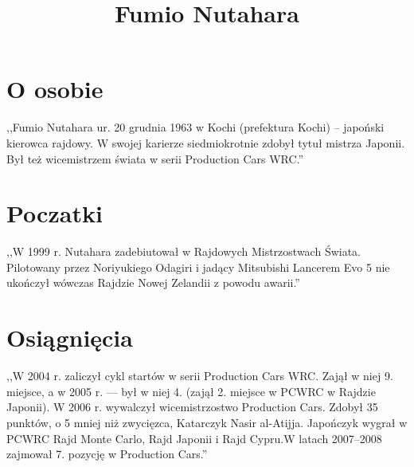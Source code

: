 \documentclass[a4paper,12pt]{article}
\title{Fumio Nutahara}
\author{}
\begin{document}
\maketitle
\section{O osobie}
\label {o_nim}
,,Fumio Nutahara ur. 20 grudnia 1963 w Kochi (prefektura Kochi) – japoński kierowca rajdowy. W swojej karierze siedmiokrotnie zdobył tytuł mistrza Japonii. Był też wicemistrzem świata w serii Production Cars WRC.''
\section{Poczatki}
\label{pocz}
,,W 1999 r. Nutahara zadebiutował w Rajdowych Mistrzostwach Świata. Pilotowany przez Noriyukiego Odagiri i jadący Mitsubishi Lancerem Evo 5 nie ukończył wówczas Rajdzie Nowej Zelandii z powodu awarii.''
\section{Osiągnięcia}
\label{osi}
,,W 2004 r. zaliczył cykl startów w serii Production Cars WRC. Zajął w niej 9. miejsce, a w 2005 r. --- był w niej 4. (zajął 2. miejsce w PCWRC w Rajdzie Japonii). W 2006 r. wywalczył wicemistrzostwo Production Cars. Zdobył 35 punktów, o 5 mniej niż zwycięzca, Katarczyk Nasir al-Atijja. Japończyk wygrał w PCWRC Rajd Monte Carlo, Rajd Japonii i Rajd Cypru.W latach 2007–2008 zajmował 7. pozycję w Production Cars.''
\end{document}
